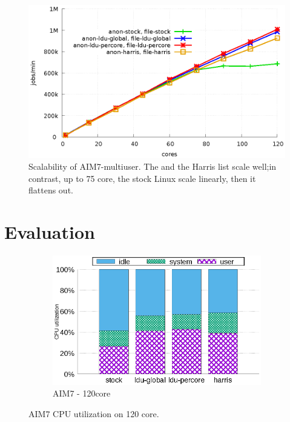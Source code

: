 

\begin{figure}[tb]
  \begin{center}
    \includegraphics[scale=0.8]{graph/aim7.eps}
  \end{center}
  \caption{Scalability of AIM7-multiuser.
  The \LDU and the Harris list scale well;in contrast, up to 75 core, the
  stock Linux scale linearly, then it flattens out.}
  \label{fig:aim7}
\end{figure}

\section{Evaluation}
\label{sec:evaluation}


\begin{figure}[tb]
    \centering
    \begin{subfigure}[b]{1\textwidth}
  \begin{center}
        \includegraphics[scale=0.8]{graph/aim7_cpuutils.eps}
        \caption{AIM7 - 120core}
  \end{center}
    \end{subfigure}%
    \centering
    \caption{AIM7 CPU utilization on 120 core.}
    \label{fig:utilization_aim7}
    
\end{figure}


